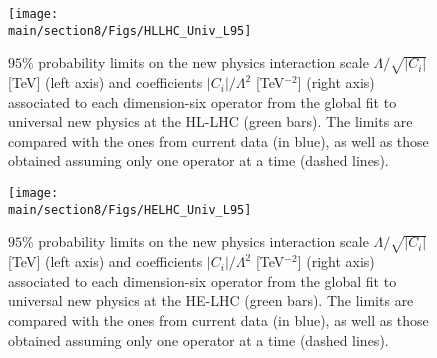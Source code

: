 \begin{figure}[h]
\centering
  \hspace{-0.1cm}\texttt{[image: \\main/section8/Figs/HLLHC\_Univ\_L95]}
  \vspace{-0.4cm}
  \caption{$95\%$ probability limits on the new physics interaction scale $\Lambda/\sqrt{\vert C_i\vert}$ [TeV] (left axis) and coefficients $\vert C_i\vert /\Lambda^2$ [TeV$^{-2}$] (right axis) associated to each dimension-six operator from the global fit to universal new physics at the HL-LHC (green bars). The limits are compared with the ones from current data (in blue), as well as those obtained assuming only one operator at a time (dashed lines).~\label{fig:dim6U_HLLHC}}
\end{figure}

\begin{figure}[h]
\centering
  \hspace{-0.1cm}\texttt{[image: \\main/section8/Figs/HELHC\_Univ\_L95]}
  \vspace{-0.4cm}
   \caption{$95\%$ probability limits on the new physics interaction scale $\Lambda/\sqrt{\vert C_i\vert }$ [TeV] (left axis) and coefficients $\vert C_i\vert/\Lambda^2$ [TeV$^{-2}$] (right axis) associated to each dimension-six operator from the global fit to universal new physics at the HE-LHC (green bars). The limits are compared with the ones from current data (in blue), as well as those obtained assuming only one operator at a time (dashed lines).~\label{fig:dim6U_HELHC}}
\end{figure}

